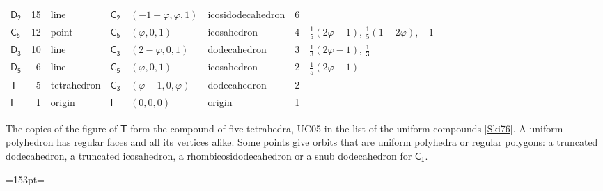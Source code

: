 \documentclass[10pt,a4paper]{article}
\newcommand{\needspace}[1]{\par\penalty-100\begingroup\dimen0=#1\relax\dimen2=\pagegoal
  \advance\dimen2-\pagetotal\ifdim\dimen0>\dimen2\relax\ifdim\dimen2>0pt\vfil\break\fi\fi
  \endgroup}
\numberwithin{equation}{section}
\newcommand{\grp}[1]{\mathsf{#1}}
\newcommand{\goldenratio}{\varphi}
\newlength{\fillwidth}\newlength{\cellwidth}\newlength{\colwidth}
\begin{document}
{{\begin{longtable}{@{}lrllllr>{\RaggedRight\arraybackslash}p{\fillwidth}r@{}}
\href{D2.pdf}{$\grp{D_{2}}$} & 15 & line & \href{C2.pdf}{$\grp{C_{2}}$} & $(-1 - \goldenratio{}, \goldenratio{}, 1)$ & icosidodecahedron & 6 &  & \\
\href{C5.pdf}{$\grp{C_{5}}$} & 12 & point & \href{C5.pdf}{$\grp{C_{5}}$} & $(\goldenratio{}, 0, 1)$ & icosahedron & 4 & ${\tfrac{1}{5}(2\goldenratio - 1)}$, ${\tfrac{1}{5}(1 - 2\goldenratio)}$, ${-1}$ & \\
\href{D3.pdf}{$\grp{D_{3}}$} & 10 & line & \href{C3.pdf}{$\grp{C_{3}}$} & $(2 - \goldenratio{}, 0, 1)$ & dodecahedron & 3 & ${\tfrac{1}{3}(2\goldenratio - 1)}$, ${\tfrac{1}{3}}$ & \\
\href{D5.pdf}{$\grp{D_{5}}$} & 6 & line & \href{C5.pdf}{$\grp{C_{5}}$} & $(\goldenratio{}, 0, 1)$ & icosahedron & 2 & ${\tfrac{1}{5}(2\goldenratio - 1)}$ & \\
\href{T.pdf}{$\grp{T}$} & 5 & tetrahedron & \href{C3.pdf}{$\grp{C_{3}}$} & $(\goldenratio - 1, 0, \goldenratio{})$ & dodecahedron & 2 &  & \\*
\href{I.pdf}{$\grp{I}$} & 1 & origin & \href{I.pdf}{$\grp{I}$} & $(0, 0, 0)$ & origin & 1 &  & \\
\bottomrule\end{longtable}}}
The copies of the figure of \href{T.pdf}{$\grp{T}$} form the compound of five tetrahedra, UC05 in the list of the uniform compounds [\href{../../../REFERENCES.pdf\#ref.Ski76}{Ski76}]. A uniform polyhedron has regular faces and all its vertices alike. Some points give orbits that are uniform polyhedra or regular polygons: a truncated dodecahedron, a truncated icosahedron, a rhombicosidodecahedron or a snub dodecahedron for \href{C1.pdf}{$\grp{C_{1}}$}.
\needspace{153pt}
\end{document}
